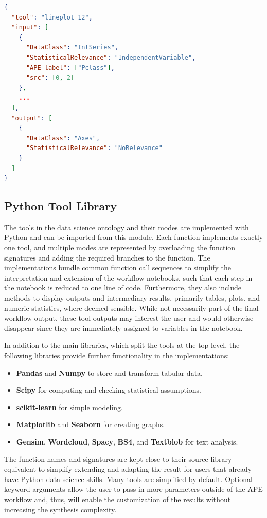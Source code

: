 \begin{lstlisting}[language=json, caption=Step in JSON Workflow Encoding., label=code:native_ape_output_parsing]
{
  "tool": "lineplot_12",
  "input": [
    {
      "DataClass": "IntSeries",
      "StatisticalRelevance": "IndependentVariable",
      "APE_label": ["Pclass"],
      "src": [0, 2]
    },
    ...
  ],
  "output": [
    {
      "DataClass": "Axes",
      "StatisticalRelevance": "NoRelevance"
    }
  ]
}
\end{lstlisting}

\subsection{Python Tool Library}
The tools in the data science ontology and their modes are implemented with Python and can be imported from this module. Each function implements exactly one tool, and multiple modes are represented by overloading the function signatures and adding the required branches to the function. The implementations bundle common function call sequences to simplify the interpretation and extension of the workflow notebooks, such that each step in the notebook is reduced to one line of code. Furthermore, they also include methods to display outputs and intermediary results, primarily tables, plots, and numeric statistics, where deemed sensible. While not necessarily part of the final workflow output, these tool outputs may interest the user and would otherwise disappear since they are immediately assigned to variables in the notebook.

In addition to the main libraries, which split the tools at the top level, the following libraries provide further functionality in the implementations:
\begin{itemize}
    \item \textbf{Pandas} and \textbf{Numpy} to store and transform tabular data.
    \item \textbf{Scipy} for computing and checking statistical assumptions.
    \item \textbf{scikit-learn} for simple modeling.
    \item \textbf{Matplotlib} and \textbf{Seaborn} for creating graphs.
    \item \textbf{Gensim}, \textbf{Wordcloud}, \textbf{Spacy}, \textbf{BS4}, and \textbf{Textblob} for text analysis.
\end{itemize}

The function names and signatures are kept close to their source library equivalent to simplify extending and adapting the result for users that already have Python data science skills. Many tools are simplified by default. Optional keyword arguments allow the user to pass in more parameters outside of the APE workflow and, thus, will enable the customization of the results without increasing the synthesis complexity.

